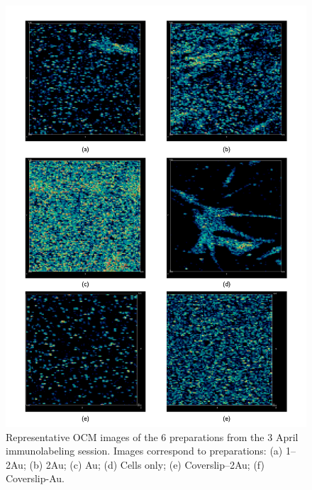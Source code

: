 \begin{figure}[htbp]
\centering
\includegraphics[keepaspectratio,width=\textwidth,height=0.75\textheight]{3aprOCMreps.pdf}
\caption{Representative OCM images of the 6 preparations from the 3 April immunolabeling session. Images correspond to preparations: (a) 1--2Au; (b) 2Au; (c) Au; (d) Cells only; (e) Coverslip--2Au; (f) Coverslip-Au.}
\label{aprocmreps}
\end{figure}

